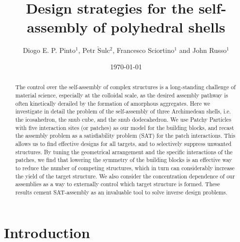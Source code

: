 \documentclass[a4paper, amsfonts, amssymb, amsmath, reprint, showkeys, nofootinbib, oneside]{revtex4-1}
\begin{document}
\title{Design strategies for the self-assembly of polyhedral shells}

\author{Diogo E. P. Pinto$^1$, Petr $\check{\text{S}}$ulc$^2$, Francesco Sciortino$^1$ and John Russo$^1$}

\date{\today} %

\begin{abstract}
The control over the self-assembly of complex structures is a long-standing challenge of material science, especially at the colloidal scale, as the desired assembly pathway is often kinetically derailed by the formation of amorphous aggregates. Here we investigate in detail the problem of the self-assembly of
three Archimedean shells,
i.e. the icosahedron, the snub cube, and the snub dodecahedron. We use Patchy Particles with five interaction sites (or patches) as our model for the building blocks, and recast the assembly problem as a satisfiability problem (SAT) for the patch interactions. This allows us to find effective designs for all targets, and to selectively suppress unwanted structures.
By tuning the geometrical arrangement and the specific interactions of the patches, we find 
that lowering the symmetry of the building blocks is an effective way to reduce the number of competing structures, which in turn can considerably increase the yield of the target structure. We also consider the concentration dependence of our assemblies as a way to externally control which target structure is formed. These results cement SAT-assembly as an invaluable tool to solve inverse design problems.
\end{abstract}

\maketitle

\section{Introduction}
\end{document}
